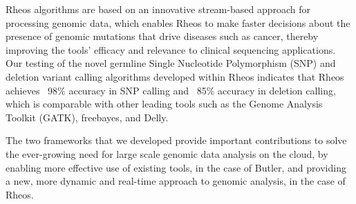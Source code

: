 Rheos algorithms are based on an innovative stream-based approach for processing genomic data, which enables Rheos to make faster decisions about the presence of genomic mutations that drive diseases such as cancer, thereby improving the tools' efficacy and relevance to clinical sequencing applications. Our testing of the novel germline Single Nucleotide Polymorphism (SNP) and deletion variant calling algorithms developed within Rheos indicates that Rheos achieves ~98\% accuracy in SNP calling and ~85\% accuracy in deletion calling, which is comparable with other leading tools such as the Genome Analysis Toolkit (GATK), freebayes, and Delly.

The two frameworks that we developed provide important contributions to solve the ever-growing need for large scale genomic data analysis on the cloud, by enabling more effective use of existing tools, in the case of Butler, and providing a new, more dynamic and real-time approach to genomic analysis, in the case of Rheos. 
\newpage
\null
\thispagestyle{empty}
\newpage